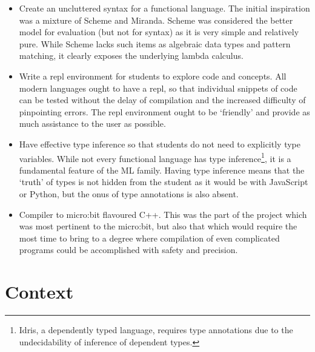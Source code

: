\documentclass[12pt, a4paper]{report}
\begin{document}
\begin{itemize}
    \item Create an uncluttered syntax for a functional language. The initial inspiration was a
        mixture of Scheme and Miranda. Scheme was considered the better model for evaluation (but
        not for syntax) as it is very simple and relatively pure. While Scheme lacks such items as algebraic data types
        and pattern matching, it clearly exposes the underlying lambda calculus.
    \item Write a repl environment for students to explore code and concepts. All modern languages
        ought to have a repl, so that individual snippets of code can be tested without the delay of
        compilation and the increased difficulty of pinpointing errors. The repl environment ought
        to be `friendly' and provide as much assistance to the user as possible. 
    \item Have effective type inference so that students do not need to explicitly type variables.
        While not every functional language has type inference\footnote{Idris, a dependently typed language,
            requires type annotations due to the undecidability of inference of dependent types.},
        it is a fundamental feature of the ML family. Having type inference means that the `truth'
        of types is not hidden from the student as it would be with JavaScript or Python, but the
        onus of type annotations is also absent.
    \item Compiler to micro:bit flavoured C++. This was the part of the project which was most
        pertinent to the micro:bit, but also that which would require the most time to bring to a
        degree where compilation of even complicated programs could be accomplished with safety and
        precision. 
\end{itemize}

\chapter{Context} 
\end{document}
